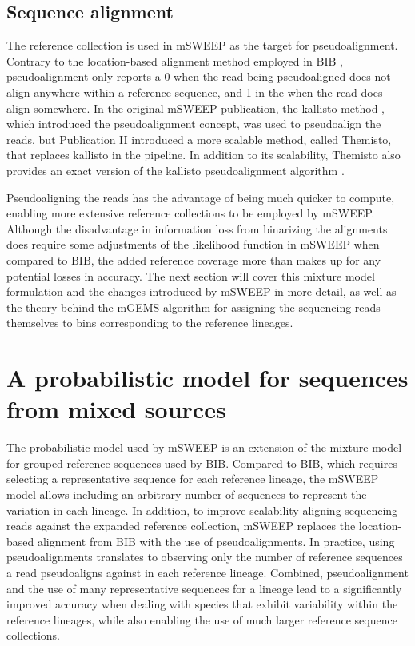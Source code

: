 \documentclass[officiallayout]{tktla}
\begin{document}
\subsection{Sequence alignment}
\label{section:sequence-alignment}

The reference collection is used in mSWEEP as the target for
pseudoalignment. Contrary to the location-based alignment method
employed in BIB \citep{sankar2016bayesian}, pseudoalignment only
reports a 0 when the read being pseudoaligned does not align anywhere
within a reference sequence, and 1 in the when the read does align
somewhere. In the original mSWEEP publication, the kallisto method
\citep{bray2016near}, which introduced the pseudoalignment concept,
was used to pseudoalign the reads, but Publication II introduced a
more scalable method, called Themisto, that replaces kallisto in the
pipeline. In addition to its scalability, Themisto also provides an
exact version of the kallisto pseudoalignment algorithm
\citep{maklin_bacterial_2021}.

Pseudoaligning the reads has the advantage of being much quicker to
compute, enabling more extensive reference collections to be employed
by mSWEEP. Although the disadvantage in information loss from
binarizing the alignments does require some adjustments of the
likelihood function in mSWEEP when compared to BIB, the added
reference coverage more than makes up for any potential losses in
accuracy. The next section will cover this mixture model formulation
and the changes introduced by mSWEEP in more detail, as well as the
theory behind the mGEMS algorithm for assigning the sequencing reads
themselves to bins corresponding to the reference lineages.

\section{A probabilistic model for sequences from mixed sources}
\label{section:model}

The probabilistic model used by mSWEEP is an extension of the mixture
model for grouped reference sequences used by BIB. Compared to BIB,
which requires selecting a representative sequence for each reference
lineage, the mSWEEP model allows including an arbitrary number of
sequences to represent the variation in each lineage. In addition, to
improve scalability aligning sequencing reads against the expanded
reference collection, mSWEEP replaces the location-based alignment
from BIB with the use of pseudoalignments. In practice, using
pseudoalignments translates to observing only the number of reference
sequences a read pseudoaligns against in each reference
lineage. Combined, pseudoalignment and the use of many representative
sequences for a lineage lead to a significantly improved accuracy when
dealing with species that exhibit variability within the reference
lineages, while also enabling the use of much larger reference
sequence collections.
\end{document}
